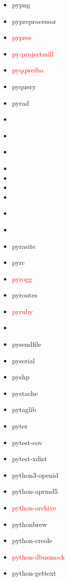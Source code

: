\documentclass{l4proj}
\begin{document}
\begin{appendices}
{\begin{itemize}
\item pypng
\item pypreprocessor
\item\textcolor{red}{pypres}
\item\textcolor{red}{py-projectmill}
\item\textcolor{red}{pyqqweibo}
\item pyquery
\item pyrad
\item {}
\item\textcolor{red}{}
\item\textcolor{red}{}
\item {}
\item {}
\item {}
\item {}
\item\textcolor{red}{}
\end{itemize}
}%
\noindent\parbox[t]{0.32\textwidth}{\raggedright%
\begin{itemize}
\item\textcolor{red}{}
\item pyrasite
\item pyrc
\item\textcolor{red}{pyrogg}
\item pyroutes
\item\textcolor{red}{pyruby}
\item {}
\item pysendfile
\item pyserial
\item pyshp
\item pystache
\item pytaglib
\item pyter
\item pytest-cov
\item pytest-xdist
\item python3-openid
\item python-aprmd5
\item\textcolor{red}{python-archive}
\item pythonbrew
\item python-creole
\item\textcolor{red}{python-dbusmock}
\item python-gettext

\end{itemize}}
\end{appendices}
\end{document}
